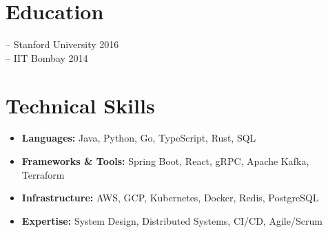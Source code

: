 \documentclass[10pt,letterpaper]{article}
\begin{document}
\section{Education}

 -- Stanford University \hfill 2016\\
 -- IIT Bombay \hfill 2014

\section{Technical Skills}

\begin{itemize}[leftmargin=1.2em, topsep=0pt, itemsep=0pt, parsep=1pt]
  \item \textbf{Languages:} Java, Python, Go, TypeScript, Rust, SQL
  \item \textbf{Frameworks \& Tools:} Spring Boot, React, gRPC, Apache Kafka, Terraform
  \item \textbf{Infrastructure:} AWS, GCP, Kubernetes, Docker, Redis, PostgreSQL
  \item \textbf{Expertise:} System Design, Distributed Systems, CI/CD, Agile/Scrum
\end{itemize}
\end{document}
